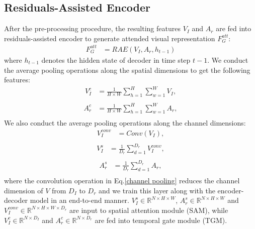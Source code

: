 \documentclass[a4paper,conference]{IEEEtran}
\begin{document}
\subsection{Residuals-Assisted Encoder}
\label{section:Residuals-Assisted Encoder}
After the pre-processing procedure, the resulting features $V_I$ and $A_r$ are fed into residuals-assisted encoder to generate attended visual representation $F_G^{att}$:
\begin{equation}
\begin{aligned}
F_G^{att} &= RAE(V_I, A_r, h_{t-1})
\end{aligned}
\end{equation}
where $h_{t-1}$ denotes the hidden state of decoder in time step $t-1$. We conduct the average pooling operations along the spatial dimensions to get the following features:
\begin{equation}
\begin{aligned}
V_{I}^{c} &= \frac{1}{H \times W} \sum_{h=1}^{H}\sum_{w=1}^{W} V_I, \\
\end{aligned}
\end{equation}
\begin{equation}
\begin{aligned}
 A_{r}^{c} &= \frac{1}{H \times W}\sum_{h=1}^{H}\sum_{w=1}^{W} A_{r},\\
\end{aligned}
\end{equation}
We also conduct the average pooling operations along the channel dimensions:
\begin{equation}
\begin{aligned}\label{channel pooling}
V_{I}^{conv} &= Conv(V_I), \\
\end{aligned}
\end{equation}
\begin{equation}
\begin{aligned}
V_{I}^{s} &= \frac{1}{D_r} \sum_{d=1}^{D_r} V_{I}^{conv},\\
\end{aligned}
\end{equation}
\begin{equation}
\begin{aligned}
A_{r}^{s} &= \frac{1}{D_r} \sum_{d=1}^{D_r} A_r,\\
\end{aligned}
\end{equation}
where the convolution operation in Eq.\ref{channel pooling} reduces the channel dimension of $V$ from $D_I$ to $D_r$ and we train this layer along with the encoder-decoder model in an end-to-end manner. $V_I^s \in \mathbb{R}^{N \times H \times W}$, $A_r^s \in \mathbb{R}^{N \times H \times W}$ and $V_I^{conv} \in \mathbb{R}^{N \times H \times W \times D_r}$ are input to spatial attention module (SAM), while $V_I^c \in \mathbb{R}^{N \times D_I}$ and $A_r^c \in \mathbb{R}^{N \times D_r}$ are fed into temporal gate module (TGM).\\
\end{document}
